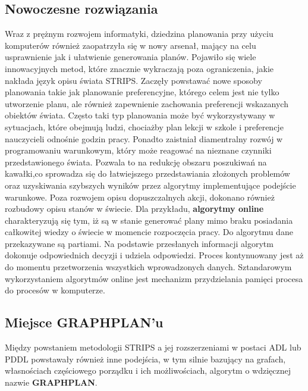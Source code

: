     \subsection{Nowoczesne rozwiązania}
    Wraz z prężnym rozwojem informatyki, dziedzina planowania przy użyciu komputerów również zaopatrzyła się 
    w nowy arsenał, mający na celu usprawnienie jak i ułatwienie generowania planów.
    Pojawiło się wiele innowacyjnych metod, które znacznie wykraczają poza ograniczenia, jakie 
    nakłada język opisu świata STRIPS. Zaczęły powstawać nowe sposoby planowania takie jak planowanie preferencyjne, którego celem jest nie tylko
    utworzenie planu, ale również zapewnienie zachowania preferencji wskazanych obiektów świata. Często taki typ planowania 
    może być wykorzystywany w sytuacjach, które obejmują ludzi, chociażby plan lekcji w szkole i preferencje nauczycieli odnośnie godzin pracy.
    Ponadto zaistniał diamentralny rozwój w programowaniu warunkowym, który może reagować na nieznane 
    czynniki przedstawionego świata. Pozwala to na redukcję obszaru poszukiwań na kawałki,co sprowadza 
    się do łatwiejszego przedstawiania złożonych problemów oraz uzyskiwania szybszych wyników przez algorytmy implementujące podejście 
    warunkowe. Poza rozwojem opisu dopuszczalnych akcji, dokonano również rozbudowy opisu stanów w świecie.
    Dla przykładu, \textbf{algorytmy online} charakteryzują się tym, iż są w stanie generować plany mimo braku posiadania całkowitej 
    wiedzy o świecie w momencie rozpoczęcia pracy. Do algorytmu dane przekazywane są partiami. Na podstawie przesłanych informacji algorytm dokonuje 
    odpowiednich decyzji i udziela odpowiedzi. Proces kontynuowany jest aż do momentu przetworzenia wszystkich wprowadzonych danych. Sztandarowym 
    wykorzystaniem algorytmów online jest mechanizm przydzielania pamięci procesa do procesów w komputerze.

    
    \subsection{Miejsce GRAPHPLAN'u}
    Między powstaniem metodologii STRIPS a jej rozszerzeniami w postaci ADL lub PDDL powstawały również inne podejścia, w tym silnie 
    bazujący na grafach, własnościach częściowego porządku i ich możliwościach, algorytm o wdzięcznej nazwie \textbf{GRAPHPLAN}.






